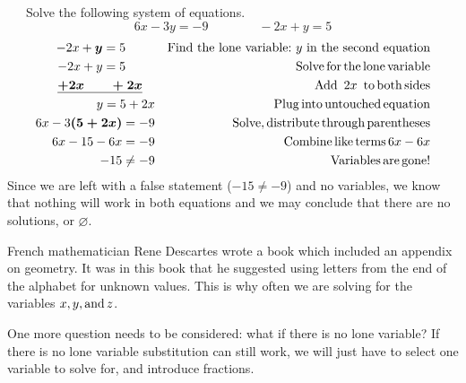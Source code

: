 \begin{example}~~~Solve the following system of equations.
      $$6 x - 3 y = - 9\qquad\qquad - 2 x + y = 5$$
  \begin{eqnarray*}
      - 2 x + \boldsymbol{y} = 5~~~~~~~ &  & \text{Find~the~lone~variable:~} y
    \text{~in~the~second~equation}\\
    - 2 x + y = 5~~~~~~~ &  & \operatorname{Solve} \operatorname{for} \operatorname{the} \operatorname{lone}
    \operatorname{variable}\\
    \boldsymbol{\underline{+ 2 x ~~~~~~+ 2 x}}~~~ &  & \operatorname{Add~} 2 x \operatorname{~to} \operatorname{both} \operatorname{sides} \\
    y = 5 + 2 x &  & \operatorname{Plug} \operatorname{into} \operatorname{untouched}
    \operatorname{equation}\\
    6 x - 3 \boldsymbol{(5 + 2 x)} = - 9 &  & \operatorname{Solve}, \operatorname{distribute}
    \operatorname{through} \operatorname{parentheses}\\
    6 x - 15 - 6 x = - 9 &  & \operatorname{Combine} \operatorname{like} \operatorname{terms} 6 x - 6
    x\\
    - 15 \neq - 9 &  & \operatorname{Variables} \operatorname{are} \operatorname{gone}!
  \end{eqnarray*}
Since we are left with a false statement ($-15\neq -9$) and no variables, we know that nothing will
work in both equations and we may conclude that there are no solutions, or $\varnothing$.
\end{example}



{} French mathematician Rene Descartes wrote a
book which included an appendix on geometry. It was in this book that he
suggested using letters from the end of the alphabet for unknown values. This
is why often we are solving for the variables $x, y, \operatorname{and} z$.\pp

One more question needs to be considered: what if there is no lone variable?
If there is no lone variable substitution can still work, we will
just have to select one variable to solve for, and introduce fractions.

